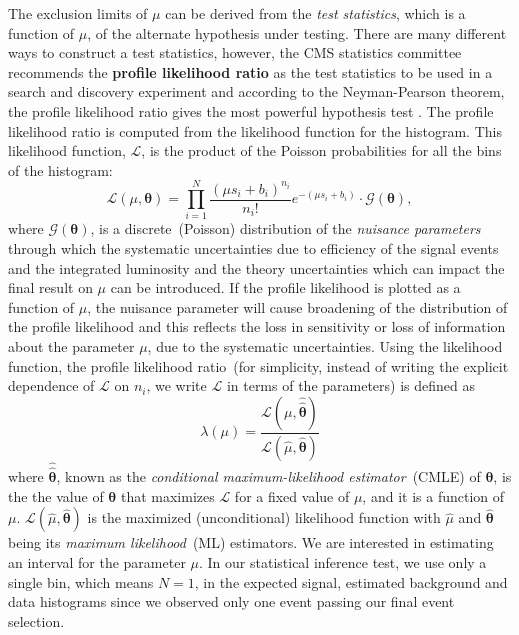 \par 
The exclusion limits of $\mu$ can be derived from the \textit{test statistics}, which is a function of $\mu$, of the alternate hypothesis under testing. There are many different ways to construct a test statistics, however, the CMS statistics committee recommends the \textbf{profile likelihood ratio} as the test statistics to be used in a search and discovery experiment and according to the Neyman-Pearson theorem, the profile likelihood ratio gives the most powerful hypothesis test \cite{NPT}. 
The profile likelihood ratio is computed from the likelihood function for the histogram. This likelihood function, $\mathcal{L}$, is the product of the Poisson probabilities for all the bins of the histogram:
\begin{equation}\label{eq:LL}
\mathcal{L}\left( \mu, \mathbf{\theta} \right) = \prod^{N}_{i=1} \frac{{\left( \mu s_{i} + b_{i} \right)}^{n_{i}}}{n_{i}!} e^{-(\mu s_{i} + b_{i})} \cdot \mathcal{G}(\mathbf{\theta} ),
\end{equation}
where $\mathcal{G}(\mathbf{\theta})$, is a discrete~(Poisson) distribution of the \textit{nuisance parameters} through which the systematic uncertainties due to efficiency of the signal events and the integrated luminosity and the theory uncertainties which can impact the final result on $\mu$ can be introduced. If the profile likelihood is plotted as a function of $\mu$, the nuisance parameter will cause broadening of the distribution of the profile likelihood and this reflects the loss in sensitivity or loss of information about the parameter $\mu$, due to the systematic uncertainties.
\newline
Using the likelihood function, the profile likelihood ratio~(for simplicity, instead of writing the explicit dependence of $\mathcal{L}$ on $n_{i}$, we write  $\mathcal{L}$ in terms of the parameters) is defined as
\begin{equation}\label{eq:PLL}
\lambda(\mu) =  \frac{\mathcal{L}(\mu, \hat{\hat{\mathbf{\theta}}})}{\mathcal{L}(\hat{\mu}, \hat{\mathbf{\theta}} )}
\end{equation}
where $\hat{\hat{\mathbf{\theta}}}$, known as the \textit{conditional maximum-likelihood estimator}~(CMLE) of $\mathbf{\theta}$, is the the value of $\mathbf{\theta}$ that maximizes $\mathcal{L}$ for a fixed value of $\mu$, and it is a function of $\mu$.  $\mathcal{L}(\hat{\mu}, \hat{\mathbf{\theta}} )$ is the maximized (unconditional) likelihood function with $\hat{\mu}$ and $\hat{\mathbf{\theta}}$ being its \textit{maximum likelihood}~(ML) estimators. 
\newline
We are interested in estimating an interval for the parameter $\mu$.
\newline
In our statistical inference test, we use only a single bin, which means $N = 1$, in the expected signal, estimated background and data histograms since we observed only one event passing our final event selection.
